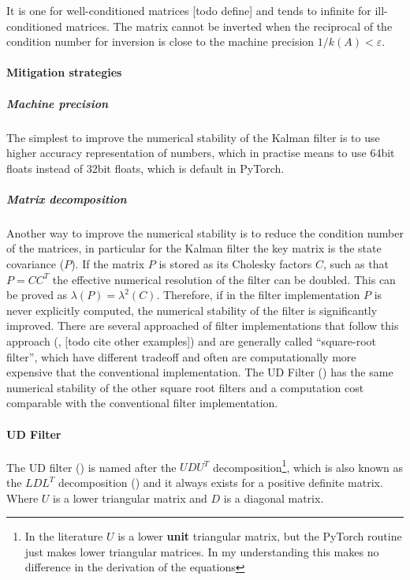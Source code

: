 \documentclass{article}
\begin{document}
It is one for well-conditioned matrices [todo define] and tends to infinite for ill-conditioned matrices.
The matrix cannot be inverted when the reciprocal of the condition number for inversion is close to the machine precision $ 1/k(A) < \varepsilon$.

\paragraph{Mitigation strategies}

\subparagraph{Machine precision} The simplest to improve the numerical stability of the Kalman filter is to use higher accuracy representation of numbers, which in practise means to use 64bit floats instead of 32bit floats, which is default in PyTorch.

\subparagraph{Matrix decomposition} Another way to improve the numerical stability is to reduce the condition number of the matrices, in particular for the Kalman filter the key matrix is the state covariance ($P$). If the matrix $P$ is stored as its Cholesky factors $C$, such as that $P = CC^T$ the effective numerical resolution of the filter can be doubled. This can be proved as $\lambda(P) = \lambda^2(C)$. Therefore, if in the filter implementation $P$ is never explicitly computed, the numerical stability of the filter is significantly improved.
There are several approached of filter implementations that follow this approach (\cite{potter_statistical_1963}, [todo cite other examples]) and are generally called ``square-root filter'', which have different tradeoff and often are computationally more expensive that the conventional implementation. The UD Filter (\cite{bierman_numerical_1977}) has the same numerical stability of the other square root filters and a computation cost comparable with the conventional filter implementation.

\paragraph{UD Filter}

The UD filter (\cite{bierman_numerical_1977}) is named after the $UDU^T$ decomposition\footnote{In the literature $U$ is a lower \textbf{unit} triangular matrix, but the PyTorch routine just makes lower triangular matrices. In my understanding this makes no difference in the derivation of the equations}, which is also known as the $LDL^T$ decomposition (\cite{golub_matrix_2013}) and it always exists for a positive definite matrix. Where $U$ is a lower triangular matrix and $D$ is a diagonal matrix.
\end{document}
